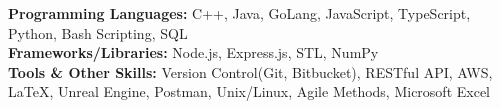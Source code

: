 
\begin{cvparagraph}
\textbf{Programming Languages:} C++, Java, GoLang, JavaScript, TypeScript, Python, Bash Scripting, SQL \vspace{0.2cm} \\
\textbf{Frameworks/Libraries:} Node.js, Express.js, STL, NumPy \vspace{0.2cm}\\
\textbf{Tools \& Other Skills:} Version Control(Git, Bitbucket), RESTful API, AWS, {\LaTeX}, Unreal Engine, Postman, Unix/Linux, Agile Methods, Microsoft Excel \vspace{0.2cm}
\end{cvparagraph}
